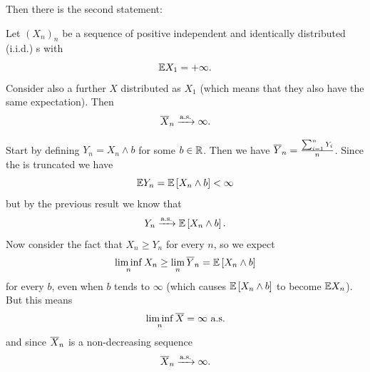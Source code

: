 \documentclass{report}
\begin{document}
Then there is the second statement:
\begin{proposition}
	Let ${(X_n)}_{n}$ be a sequence of positive independent and identically distributed (i.i.d.) \rv s with
	\[\mathbb{E} X_1=+\infty.\]
	Consider also a further \rv{} $X$ distributed as $X_1$ (which means that they also have the same expectation). Then
	\[\overline{X}_{n}\xrightarrow[]{\text{a.s.}}\infty.\]
\end{proposition}
\begin{fancyproof}
	Start by defining $Y_{n}=X_{n}\wedge b$ for some $b\in\mathbb{R}$. Then we have $\overline{Y}_{n}=\frac{\sum_{i=1}^{n}Y_{i}}{n}$. Since the \rv{} is truncated we have
	\[\mathbb{E} Y_{n}=\mathbb{E}\left[X_{n}\wedge b\right]<\infty\]
	but by the previous result we know that
	\[Y_{n}\xrightarrow[]{\text{a.s.}}\mathbb{E}\left[X_{n}\wedge b\right].\]
	Now consider the fact that $X_{n}\geq Y_{n}$ for every $n$, so we expect 
	\[\liminf_n X_{n}\geq\lim_{n}\overline{Y}_{n}=\mathbb{E}\left[X_{n}\wedge b\right]\]
	for every $b$, even when $b$ tends to $\infty$ (which causes $\mathbb{E}\left[X_{n}\wedge b\right]$ to become $\mathbb{E} X_{n}$). But this means
	\[\liminf_n\overline{X}=\infty\text{ a.s.}\]
	and since $\overline{X}_{n}$ is a non-decreasing sequence
	\[\overline{X}_{n}\xrightarrow[]{\text{a.s.}} \infty.\]
\end{fancyproof}
\end{document}
